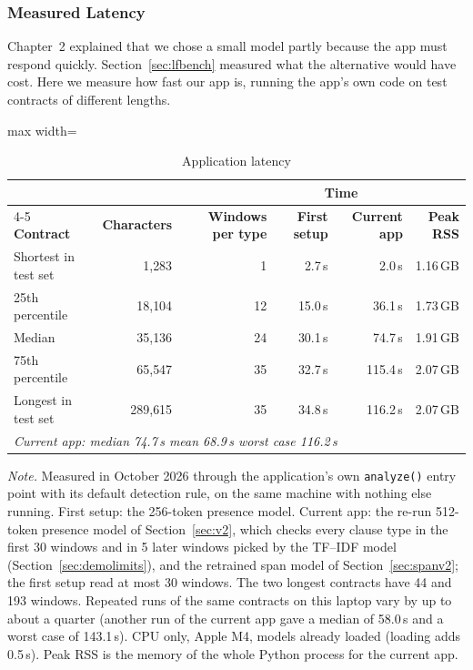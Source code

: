 \subsubsection{Measured Latency}
\label{sec:appbench}
Chapter~2 explained that we chose a small model partly because the app must respond quickly. Section~\ref{sec:lfbench} measured what the alternative would have cost. Here we measure how fast our app is, running the app's own code on test contracts of different lengths.

\begin{table}[ht]
\centering
\caption{Application latency}
\label{tab:appbench}
\small
\begin{adjustbox}{max width=\textwidth}
\begin{tabular}{lrrrrr}
\toprule
 & & & \multicolumn{2}{c}{\textbf{Time}} & \\
\cmidrule(lr){4-5}
\textbf{Contract} & \textbf{Characters} & \textbf{Windows per type} & \textbf{First setup} & \textbf{Current app} & \textbf{Peak RSS}\\
\midrule
Shortest in test set & 1{,}283 & 1 & 2.7\,s & 2.0\,s & 1.16\,GB\\
25th percentile & 18{,}104 & 12 & 15.0\,s & 36.1\,s & 1.73\,GB\\
Median & 35{,}136 & 24 & 30.1\,s & 74.7\,s & 1.91\,GB\\
75th percentile & 65{,}547 & 35 & 32.7\,s & 115.4\,s & 2.07\,GB\\
Longest in test set & 289{,}615 & 35 & 34.8\,s & 116.2\,s & 2.07\,GB\\
\midrule
\multicolumn{6}{l}{\emph{Current app: median 74.7\,s \quad mean 68.9\,s \quad worst case 116.2\,s}}\\
\bottomrule
\end{tabular}
\end{adjustbox}

{\footnotesize\singlespacing \emph{Note.} Measured in October 2026 through the application's own \texttt{analyze()} entry point with its default detection rule, on the same machine with nothing else running. First setup: the 256-token presence model. Current app: the re-run 512-token presence model of Section~\ref{sec:v2}, which checks every clause type in the first 30 windows and in 5 later windows picked by the TF--IDF model (Section~\ref{sec:demolimits}), and the retrained span model of Section~\ref{sec:spanv2}; the first setup read at most 30 windows. The two longest contracts have 44 and 193 windows. Repeated runs of the same contracts on this laptop vary by up to about a quarter (another run of the current app gave a median of 58.0\,s and a worst case of 143.1\,s). CPU only, Apple M4, models already loaded (loading adds 0.5\,s). Peak RSS is the memory of the whole Python process for the current app.\par}
\end{table}

